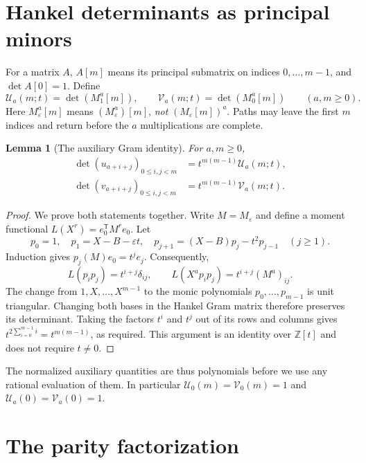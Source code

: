 \documentclass[11pt]{article}
\newtheorem{lemma}[theorem]{Lemma}
\theoremstyle{definition}
\theoremstyle{remark}
\newcommand{\Z}{\mathbb Z}
\newcommand{\U}{\mathcal U}
\newcommand{\V}{\mathcal V}
\newcommand{\eps}{\varepsilon}
\numberwithin{equation}{section}
\begin{document}
\section{Hankel determinants as principal minors}
\label{sec:gram}

For a matrix $A$, $A[m]$ means its principal submatrix on indices
$0,\ldots,m-1$, and $\det A[0]=1$. Define
\begin{equation}
 \U_a(m;t)=\det(M_1^a[m]),\qquad
 \V_a(m;t)=\det(M_0^a[m])\qquad(a,m\ge0).
 \label{eq:UV}
\end{equation}
Here $M_\eps^a[m]$ means $(M_\eps^a)[m]$, \emph{not}
$(M_\eps[m])^a$. Paths may leave the first $m$ indices and return before
the $a$ multiplications are complete.

\begin{lemma}[The auxiliary Gram identity]
\label{lem:gram}
For $a,m\ge0$,
\begin{align}
 \det(u_{a+i+j})_{0\le i,j<m}&=t^{m(m-1)}\U_a(m;t),\label{eq:gram-u}\\
 \det(v_{a+i+j})_{0\le i,j<m}&=t^{m(m-1)}\V_a(m;t).\label{eq:gram-v}
\end{align}
\end{lemma}
\begin{proof}
We prove both statements together. Write $M=M_\eps$ and define a moment
functional $L(X^r)=e_0^{\mathsf T}M^re_0$. Let
\[
 p_0=1,\quad p_1=X-B-\eps t,\quad
 p_{j+1}=(X-B)p_j-t^2p_{j-1}\quad(j\ge1).
\]
Induction gives $p_j(M)e_0=t^j e_j$. Consequently,
\begin{equation}
 L(p_i p_j)=t^{i+j}\delta_{ij},\qquad
 L(X^a p_i p_j)=t^{i+j}(M^a)_{ij}.
 \label{eq:orthogonality}
\end{equation}
The change from $1,X,\ldots,X^{m-1}$ to the monic polynomials
$p_0,\ldots,p_{m-1}$ is unit triangular. Changing both bases in the Hankel
Gram matrix therefore preserves its determinant. Taking the factors $t^i$
and $t^j$ out of its rows and columns gives
$t^{2\sum_{i=0}^{m-1}i}=t^{m(m-1)}$, as required.
This argument is an identity over $\Z[t]$ and does not require $t\ne0$.
\end{proof}

The normalized auxiliary quantities are thus polynomials before we use any
rational evaluation of them. In particular $\U_0(m)=\V_0(m)=1$ and
$\U_a(0)=\V_a(0)=1$.

\section{The parity factorization}
\label{sec:factor}
\end{document}
